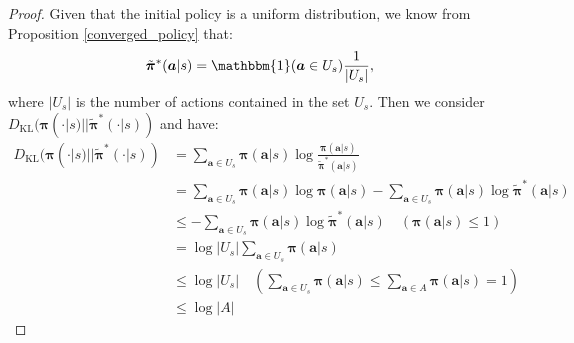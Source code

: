 \documentclass{article}
\begin{document}
	\begin{proof}
	    \mbox{}\par
	    Given that the initial policy is a uniform distribution, we know from Proposition \ref{converged_policy} that:
	    \begin{equation}
	        \tilde{\bm{\pi}}^*(\bm{a}|s) = \mathbbm{1}(\bm{a} \in U_s) \frac{1}{|U_s|},
	    \end{equation}
	    where $|U_s|$ is the number of actions contained in the set $U_s$. Then we consider $D_{\operatorname{KL}}(\bm{\pi}(\cdot|s) || \tilde{\bm{\pi}}^*(\cdot|s))$ and have:
	    \begin{align}
	        D_{\operatorname{KL}}(\bm{\pi}(\cdot|s) || \tilde{\bm{\pi}}^*(\cdot|s)) & = \sum_{\bm{a} \in U_s} \bm{\pi}(\bm{a}|s) \log \frac{\bm{\pi}(\bm{a}|s) }{\tilde{\bm{\pi}}^*(\bm{a}|s)} \\
	        & = \sum_{\bm{a} \in U_s} \bm{\pi}(\bm{a}|s) \log \bm{\pi}(\bm{a}|s) - \sum_{\bm{a} \in U_s} \bm{\pi}(\bm{a}|s) \log \tilde{\bm{\pi}}^*(\bm{a}|s) \\
	        & \le - \sum_{\bm{a} \in U_s} \bm{\pi}(\bm{a}|s) \log \tilde{\bm{\pi}}^*(\bm{a}|s) \quad (\bm{\pi}(\bm{a}|s) \le 1 ) \\
	        & = \log |U_s| \sum_{\bm{a} \in U_s} \bm{\pi}(\bm{a}|s) \\
	        & \le \log |U_s| \quad (\sum_{\bm{a} \in U_s} \bm{\pi}(\bm{a}|s) \le \sum_{\bm{a} \in A} \bm{\pi}(\bm{a}|s) = 1 ) \\
	        & \le \log |A| \label{KL-bound}
	    \end{align} 
	    

\end{proof}
\end{document}
